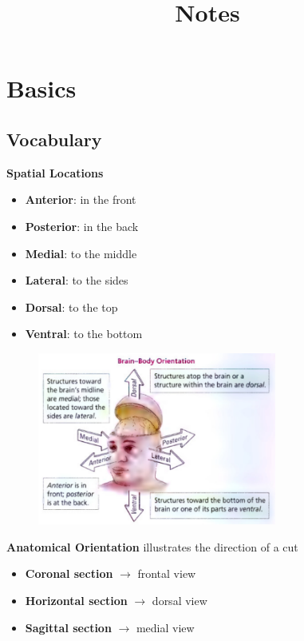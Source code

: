 \documentclass{article}
\title{Notes}
\begin{document}
\maketitle
\section{Basics}

\subsection{Vocabulary}

\textbf{Spatial Locations}
\begin{itemize}
\item {
    \textbf{Anterior}: in the front
}\item {
    \textbf{Posterior}: in the back
}\item {
    \textbf{Medial}: to the middle
}\item {
    \textbf{Lateral}: to the sides
}\item {
    \textbf{Dorsal}: to the top
}\item {
    \textbf{Ventral}: to the bottom
}
\end{itemize}

\begin{figure}[h]
    \includegraphics[width=0.7\textwidth]{../../.resources/brain_body_orientation.png}
\end{figure}


\noindent
\textbf{Anatomical Orientation}
illustrates the direction of a cut
\begin{itemize}
\item {
    \textbf{Coronal section} \(\rightarrow\) frontal view
}\item {
    \textbf{Horizontal section} \(\rightarrow\) dorsal view
}\item {
    \textbf{Sagittal section} \(\rightarrow\) medial view
}
\end{itemize}
\end{document}
